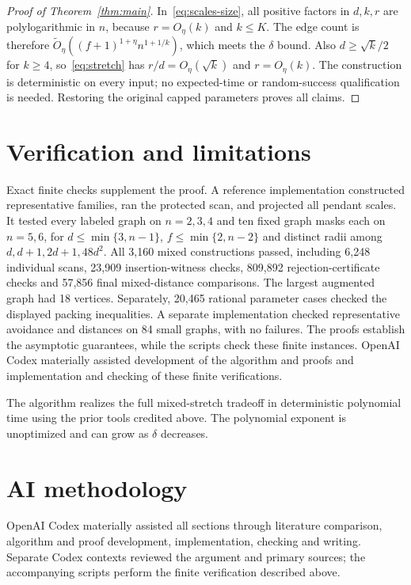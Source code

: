 \documentclass[acmsmall,11pt,screen,nonacm]{acmart}
\newcommand{\Ot}{\widetilde{O}}
\begin{document}
\begin{proof}[Proof of Theorem~\ref{thm:main}]
In~\eqref{eq:scales-size}, all positive factors in $d,k,r$ are
polylogarithmic in $n$, because $r=O_\eta(k)$ and $k\le K$.
The edge count is therefore
$\Ot_\eta((f+1)^{1+\eta}n^{1+1/k})$, which meets the $\delta$ bound.
Also $d\ge\sqrt{k}/2$ for $k\ge4$, so~\eqref{eq:stretch} has
$r/d=O_\eta(\sqrt{k})$ and $r=O_\eta(k)$.
The construction is deterministic on every input; no expected-time or
random-success qualification is needed. Restoring the original capped
parameters proves all claims.
\end{proof}

\section{Verification and limitations}

Exact finite checks supplement the proof. A reference implementation
constructed representative families, ran the protected scan, and projected
all pendant scales. It tested every labeled graph on $n=2,3,4$ and ten
fixed graph masks each on $n=5,6$, for
$d\le\min\{3,n-1\}$, $f\le\min\{2,n-2\}$ and distinct radii among
$d,d+1,2d+1,48d^2$. All 3,160 mixed constructions passed, including
6,248 individual scans, 23,909 insertion-witness checks, 809,892
rejection-certificate checks and 57,856 final mixed-distance comparisons.
The largest augmented graph had 18 vertices. Separately, 20,465 rational
parameter cases checked the displayed packing inequalities. A separate
implementation checked representative avoidance and distances on 84 small
graphs, with no failures. The proofs establish the asymptotic guarantees,
while the scripts check these finite instances. OpenAI Codex materially
assisted development of the algorithm and proofs and implementation and
checking of these finite verifications.

The algorithm realizes the full mixed-stretch tradeoff in deterministic
polynomial time using the prior tools credited above. The polynomial
exponent is unoptimized and can grow as $\delta$ decreases.

\section*{AI methodology}
OpenAI Codex materially assisted all sections through literature comparison,
algorithm and proof development, implementation, checking and writing.
Separate Codex contexts reviewed the argument and primary sources; the
accompanying scripts perform the finite verification described above.



\end{document}
